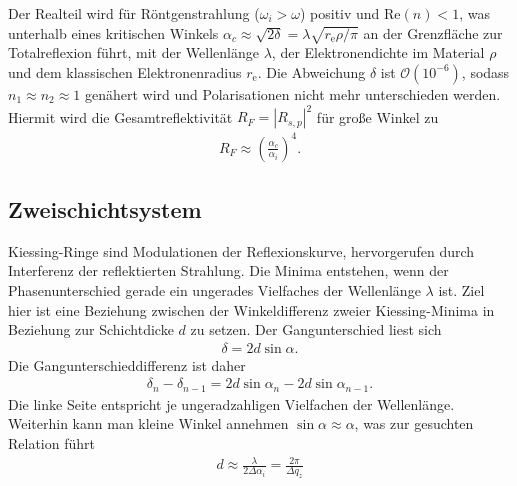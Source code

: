 Der Realteil wird für Röntgenstrahlung ($\omega_i >\omega$) positiv und $\text{Re}(n)<1$, was
unterhalb eines kritischen Winkels $\alpha_c\approx \sqrt{2\delta}=\lambda\sqrt{r_\text{e}\rho /\pi}$ an der Grenzfläche zur Totalreflexion führt, mit
der Wellenlänge $\lambda$, der Elektronendichte im Material $\rho$ und dem klassischen Elektronenradius $r_\text{e}$. Die Abweichung $\delta$ ist 
$\mathcal{O}(10^{-6})$, sodass 
$n_1 \approx n_2 \approx 1$ genähert wird und Polarisationen nicht mehr unterschieden werden. Hiermit wird die Gesamtreflektivität $R_F = |R_{s,p}|^2$ für
große Winkel zu
\begin{align}
 R_F \approx \left(\frac{\alpha_c}{\alpha_i}\right)^4.
\end{align}

\subsection{Zweischichtsystem}
Kiessing-Ringe sind Modulationen der Reflexionskurve, hervorgerufen durch Interferenz der reflektierten Strahlung. Die Minima entstehen, wenn der 
Phasenunterschied gerade ein ungerades Vielfaches der Wellenlänge $\lambda$ ist. Ziel hier ist eine Beziehung zwischen der Winkeldifferenz zweier Kiessing-Minima 
in Beziehung zur Schichtdicke $d$ zu setzen. Der Gangunterschied liest sich
\begin{align}
 \delta = 2 d \sin\alpha.
\end{align}
Die Gangunterschieddifferenz ist daher
\begin{align}
 \delta_n -\delta_{n-1}= 2 d \sin\alpha_n - 2d\sin\alpha_{n-1}.
\end{align}
Die linke Seite entspricht je ungeradzahligen Vielfachen der Wellenlänge. Weiterhin kann man kleine Winkel annehmen $\sin\alpha \approx \alpha$, was zur
gesuchten Relation führt
\begin{align}
 d \approx \frac{\lambda}{2\Delta\alpha_i} = \frac{2\pi}{\Delta q_z}
\end{align}

